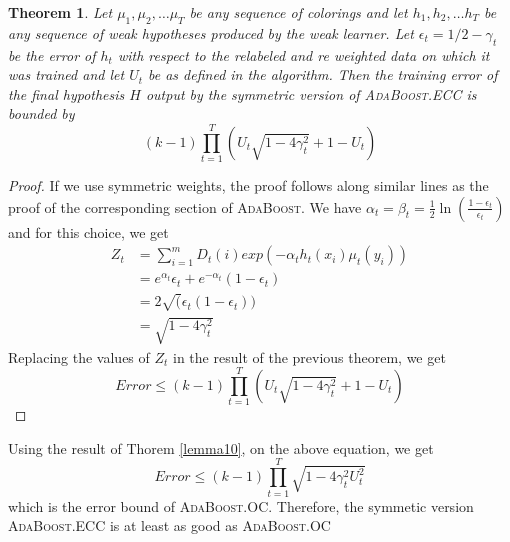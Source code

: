 \documentclass[11pt]{article}
\newtheorem{theorem}{Theorem}
\begin{document}
\begin{theorem}
Let $\mu_1, \mu_2, \ldots \mu_T$ be any sequence of colorings and let $h_1, h_2, \ldots h_T$ be any sequence of weak hypotheses produced by the weak learner. Let $\epsilon_t = 1/2 - \gamma_t$ be the error of $h_t$ with respect to the relabeled and re weighted data on which it was trained and let $U_t$ be as defined in the algorithm. Then the training error of the final hypothesis $H$ output by the symmetric version of \textsc{AdaBoost}.ECC is bounded by 
$$(k-1)\prod_{t=1}^T \left(U_t \sqrt{1-4\gamma_t^2} + 1-U_t\right)$$
\end{theorem}
\begin{proof}
If we use symmetric weights, the proof follows along similar lines as the proof of the corresponding section of \textsc{AdaBoost}. 
We have $\alpha_t = \beta_t = \frac{1}{2} \ln (\frac{1-\epsilon_t}{\epsilon_t})$ and for this choice, we get 
\begin{align*}
Z_t &= \sum_{i=1}^m D_t(i) exp(-\alpha_t h_t(x_i) \mu_t(y_i))\\
&= e^{\alpha_t}\epsilon_t + e^{-\alpha_t}(1-\epsilon_t)\\
&= 2 \sqrt(\epsilon_t(1-\epsilon_t))\\
&= \sqrt{1-4\gamma_t^2}
\end{align*}
Replacing the values of $Z_t$ in the result of the previous theorem, we get
$$Error \le (k-1)\prod_{t=1}^T \left(U_t \sqrt{1-4\gamma_t^2} + 1-U_t\right)$$
\end{proof}
Using the result of Thorem \ref{lemma10}, on the above equation, we get
$$Error \le (k-1)\prod_{t=1}^T \sqrt{1-4\gamma_t^2 U_t^2} $$ which is the error bound of \textsc{AdaBoost}.OC. Therefore, the symmetic version \textsc{AdaBoost}.ECC is at least as good as \textsc{AdaBoost}.OC

\printbibliography[heading=bibintoc,title={References}]
\end{document}
